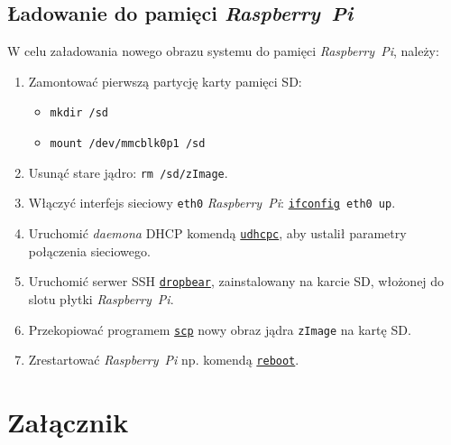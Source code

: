 \documentclass{article}
\begin{document}

\subsection{Ładowanie do pamięci \emph{Raspberry~Pi}}

W celu załadowania nowego obrazu systemu do pamięci \emph{Raspberry~Pi}, należy:
\begin{enumerate}
\item Zamontować pierwszą partycję karty pamięci SD:
\begin{itemize}
\item \texttt{mkdir /sd}
\item \texttt{mount /dev/mmcblk0p1 /sd}
\end{itemize}
\item Usunąć stare jądro: \texttt{rm /sd/zImage}.
\item Włączyć interfejs sieciowy \texttt{eth0} \emph{Raspberry~Pi}: \texttt{\href{http://linux.die.net/man/8/ifconfig}{ifconfig} eth0 up}.
\item Uruchomić \emph{daemona} DHCP komendą \texttt{\href{http://dev.man-online.org/man8/udhcpc/}{udhcpc}}, aby ustalił parametry połączenia sieciowego.
\item Uruchomić serwer SSH \texttt{\href{https://matt.ucc.asn.au/dropbear/dropbear.html}{dropbear}}, zainstalowany na karcie SD, włożonej do slotu płytki \emph{Raspberry~Pi}.
\item Przekopiować programem \texttt{\href{http://linux.die.net/man/1/scp}{scp}} nowy obraz jądra \texttt{zImage} na kartę SD.
\item Zrestartować \emph{Raspberry~Pi} np. komendą \texttt{\href{http://linux.die.net/man/8/reboot}{reboot}}.
\end{enumerate}


\section{Załącznik}
\end{document}
